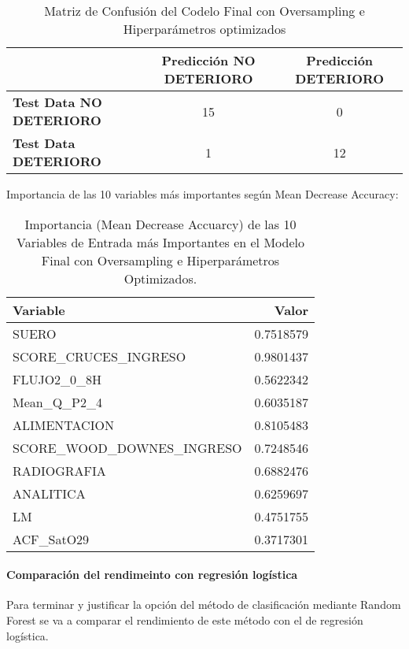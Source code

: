 \begin{table}[H]
    \centering
    \begin{tabular}{lcc}
        \toprule
        & \textbf{Predicción NO DETERIORO} & \textbf{Predicción DETERIORO} \\
        \midrule
        \textbf{Test Data NO DETERIORO} & 15 & 0 \\
        \textbf{Test Data DETERIORO} & 1 & 12 \\
        \bottomrule
    \end{tabular}
    \caption{Matriz de Confusión del Codelo Final con Oversampling e Hiperparámetros optimizados}
    \label{tabla:confusion_matrix_final_Hiper}
\end{table}


Importancia de las 10 variables más importantes según Mean Decrease Accuracy:

\begin{table}[H]
    \centering
    \begin{tabular}{|l|r|}
        \hline
        \textbf{Variable} & \textbf{Valor} \\
        \hline
        SUERO & 0.7518579 \\
        SCORE\_CRUCES\_INGRESO & 0.9801437 \\
        FLUJO2\_0\_8H & 0.5622342 \\
        Mean\_Q\_P2\_4 & 0.6035187 \\
        ALIMENTACION & 0.8105483 \\
        SCORE\_WOOD\_DOWNES\_INGRESO & 0.7248546 \\
        RADIOGRAFIA & 0.6882476 \\
        ANALITICA & 0.6259697 \\
        LM & 0.4751755 \\
        ACF\_SatO29 & 0.3717301 \\
        \hline
    \end{tabular}
    \caption{Importancia (Mean Decrease Accuarcy) de las 10 Variables de Entrada más Importantes en el Modelo Final con Oversampling e Hiperparámetros Optimizados.}
    \label{tabla:importancia_variables_modelo_final_Hiper}
\end{table}

\paragraph{Comparación del rendimeinto con regresión logística}

Para terminar y justificar la opción del método de clasificación mediante Random Forest se va a comparar el rendimiento de este método con el de regresión logística.

